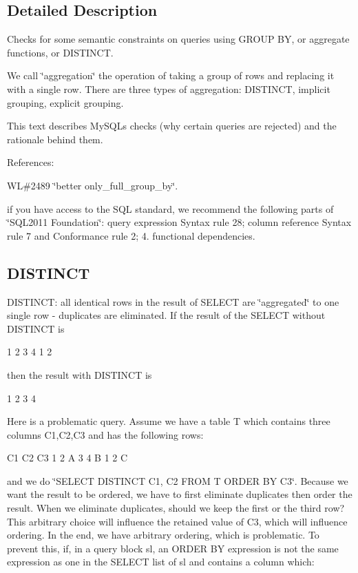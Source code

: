 \subsection{Detailed Description}
Checks for some semantic constraints on queries using G\+R\+O\+UP BY, or aggregate functions, or D\+I\+S\+T\+I\+N\+CT.

We call \char`\"{}aggregation\char`\"{} the operation of taking a group of rows and replacing it with a single row. There are three types of aggregation\+: D\+I\+S\+T\+I\+N\+CT, implicit grouping, explicit grouping.

This text describes My\+S\+QL\textquotesingle{}s checks (why certain queries are rejected) and the rationale behind them.

References\+:
\begin{DoxyItemize}
\item WL\#2489 \char`\"{}better only\+\_\+full\+\_\+group\+\_\+by\char`\"{}.
\item if you have access to the S\+QL standard, we recommend the following parts of \char`\"{}\+S\+Q\+L2011 Foundation\char`\"{}\+: query expression Syntax rule 28; column reference Syntax rule 7 and Conformance rule 2; 4. functional dependencies.
\end{DoxyItemize}\hypertarget{group__AGGREGATE__CHECKS_DISTINCT}{}\subsection{D\+I\+S\+T\+I\+N\+CT}\label{group__AGGREGATE__CHECKS_DISTINCT}
D\+I\+S\+T\+I\+N\+CT\+: all identical rows in the result of S\+E\+L\+E\+CT are \char`\"{}aggregated\char`\"{} to one single row -\/ duplicates are eliminated. If the result of the S\+E\+L\+E\+CT without D\+I\+S\+T\+I\+N\+CT is \begin{DoxyVerb}1 2
3 4
1 2
\end{DoxyVerb}
 then the result with D\+I\+S\+T\+I\+N\+CT is \begin{DoxyVerb}1 2
3 4
\end{DoxyVerb}
 Here is a problematic query. Assume we have a table T which contains three columns C1,C2,C3 and has the following rows\+: \begin{DoxyVerb}C1 C2 C3
1  2  A
3  4  B
1  2  C
\end{DoxyVerb}
 and we do \char`\"{}\+S\+E\+L\+E\+C\+T D\+I\+S\+T\+I\+N\+C\+T C1, C2 F\+R\+O\+M T O\+R\+D\+E\+R B\+Y C3\char`\"{}. Because we want the result to be ordered, we have to first eliminate duplicates then order the result. When we eliminate duplicates, should we keep the first or the third row? This arbitrary choice will influence the retained value of C3, which will influence ordering. In the end, we have arbitrary ordering, which is problematic. To prevent this, if, in a query block \textquotesingle{}sl\textquotesingle{}, an O\+R\+D\+ER BY expression is not the same expression as one in the S\+E\+L\+E\+CT list of \textquotesingle{}sl\textquotesingle{} and contains a column which\+:

